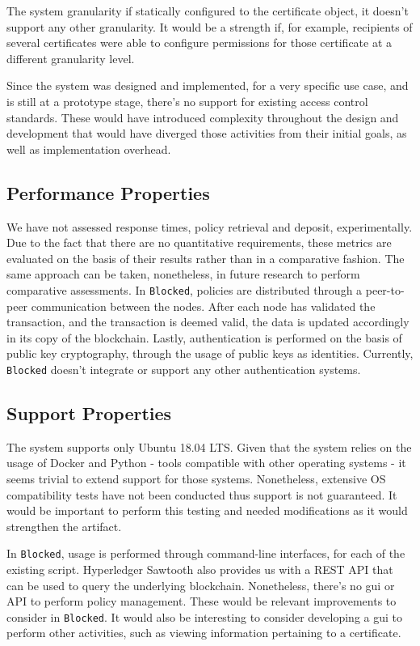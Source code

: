 The system granularity if statically configured to the certificate object, it doesn't support any other granularity. It would be a strength if, for example, recipients of several certificates were able to configure permissions for those certificate at a different granularity level.

Since the system was designed and implemented, for a very specific use case, and is still at a prototype stage, there's no support for existing access control standards. These would have introduced complexity throughout the design and development that would have diverged those activities from their initial goals, as well as implementation overhead.

\subsection{Performance Properties}

We have not assessed response times, policy retrieval and deposit, experimentally. Due to the fact that there are no quantitative requirements, these metrics are evaluated on the basis of their results rather than in a comparative fashion. The same approach can be taken, nonetheless, in future research to perform comparative assessments. In \texttt{Blocked}, policies are distributed through a peer-to-peer communication between the nodes. After each node has validated the transaction, and the transaction is deemed valid, the data is updated accordingly in its copy of the blockchain. Lastly, authentication is performed on the basis of public key cryptography, through the usage of public keys as identities. Currently, \texttt{Blocked} doesn't integrate or support any other authentication systems.

\subsection{Support Properties}

The system supports only Ubuntu 18.04 LTS. Given that the system relies on the usage of Docker and Python - tools compatible with other operating systems - it seems trivial to extend support for those systems. Nonetheless, extensive OS compatibility tests have not been conducted thus support is not guaranteed. It would be important to perform this testing and needed modifications as it would strengthen the artifact.

In \texttt{Blocked}, usage is performed through command-line interfaces, for each of the existing script. Hyperledger Sawtooth also provides us with a REST API that can be used to query the underlying blockchain. Nonetheless, there's no \gls{gui} or API to perform policy management. These would be relevant improvements to consider in \texttt{Blocked}. It would also be interesting to consider developing a \gls{gui} to perform other activities, such as viewing information pertaining to a certificate.

